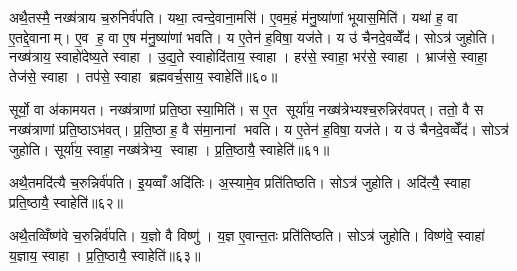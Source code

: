 अथै॒तस्मै॒ नख्ष॑त्राय च॒रुनिर्व॑पति। यथा॒ त्वन्दे॒वाना॒मसि॑। ए॒वम॒हं म॑नु॒ष्या॑णां भूयास॒मिति॑। यथा॑ ह॒ वा ए॒तद्दे॒वानाम्। ए॒व ह॒ वा ए॒ष म॑नु॒ष्या॑णां भवति। य ए॒तेन॑ ह॒विषा॒ यज॑ते। य उ॑ चैनदे॒वव्वेँद॑। सोऽत्र॑ जुहोति। नख्ष॑त्राय॒ स्वाहो॑देष्य॒ते स्वाहा। उ॒द्य॒ते स्वाहोदि॑ताय॒ स्वाहा। हर॑से॒ स्वाहा॒ भर॑से॒ स्वाहा। भ्राज॑से॒ स्वाहा॒ तेज॑से॒ स्वाहा। तप॑से॒ स्वाहा ब्रह्मवर्च॒साय॒ स्वाहेति॑॥६०॥

सूर्यो॒ वा अ॑कामयत। नख्ष॑त्राणां प्रति॒ष्ठा स्या॒मिति॑। स ए॒त सूर्या॑य॒ नख्ष॑त्रेभ्यश्च॒रुन्निर॑वपत्। ततो॒ वै स नख्ष॑त्राणां प्रति॒ष्ठाऽभ॑वत्। प्र॒ति॒ष्ठा ह॒ वै स॑मा॒नानां भवति। य ए॒तेन॑ ह॒विषा॒ यज॑ते। य उ॑ चैनदे॒वव्वेँद॑। सोऽत्र॑ जुहोति। सूर्या॑य॒ स्वाहा॒ नख्ष॑त्रेभ्य॒ स्वाहा। प्र॒ति॒ष्ठायै॒ स्वाहेति॑॥६१॥

अथै॒तमदि॑त्यै च॒रुन्निर्व॑पति। इ॒यव्वाँ अदि॑तिः। अ॒स्यामे॒व प्रति॑तिष्ठति। सोऽत्र॑ जुहोति। अदि॑त्यै॒ स्वाहा प्रति॒ष्ठायै॒ स्वाहेति॑॥६२॥

अथै॒तव्विँष्ण॑वे च॒रुन्निर्व॑पति। य॒ज्ञो वै विष्णु॑। य॒ज्ञ ए॒वान्त॒तः प्रति॑तिष्ठति। सोऽत्र॑ जुहोति। विष्ण॑वे॒ स्वाहा॑ य॒ज्ञाय॒ स्वाहा। प्र॒ति॒ष्ठायै॒ स्वाहेति॑॥६३॥



